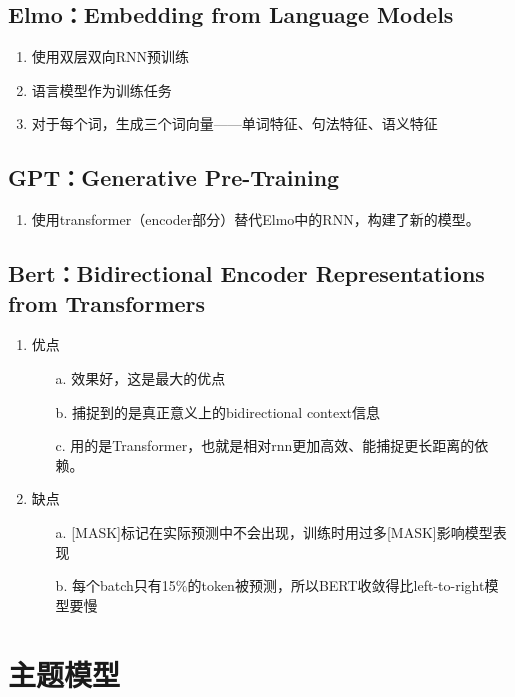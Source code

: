 \documentclass[UTF8]{article}%
\begin{document}
		\subsection{Elmo：Embedding from Language Models}
		
		\begin{enumerate}
			\item 使用双层双向RNN预训练
			\item 语言模型作为训练任务
			\item 对于每个词，生成三个词向量——单词特征、句法特征、语义特征
		\end{enumerate}
		\subsection{GPT：Generative Pre-Training}
		
		\begin{enumerate}
			\item 使用transformer（encoder部分）替代Elmo中的RNN，构建了新的模型。
		\end{enumerate}
		\subsection{Bert：Bidirectional Encoder Representations from Transformers}
		\begin{enumerate}
			\item 优点
			\begin{itemize}
				\item[a.] 效果好，这是最大的优点 
				\item[b.] 捕捉到的是真正意义上的bidirectional context信息
				\item[c.] 用的是Transformer，也就是相对rnn更加高效、能捕捉更长距离的依赖。
			\end{itemize}
			\item 缺点
			\begin{itemize}
				\item[a.] [MASK]标记在实际预测中不会出现，训练时用过多[MASK]影响模型表现
				\item[b.] 每个batch只有15\%的token被预测，所以BERT收敛得比left-to-right模型要慢
			\end{itemize}
		\end{enumerate}
	\newpage
	\section{主题模型}
\end{document}
